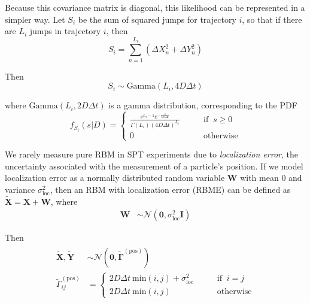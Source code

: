 \documentclass{article}
\renewcommand{\vec}{\mathbf}
\begin{document}
Because this covariance matrix is diagonal, this likelihood can be represented in a 
simpler way. Let $S_{i}$ be the sum of squared jumps for trajectory $i$, 
so that if there are $L_{i}$ jumps in trajectory $i$, then
\[
	S_{i} = \sum\limits_{n=1}^{L_{i}} \left( \Delta X_{n}^{2} + \Delta Y_{n}^{2} \right)
\]

Then 
\[
	S_{i} \sim \text{Gamma} \left( L_{i}, 4 D \Delta t \right)
\]

where $\text{Gamma} \left( L_{i}, 2 D \Delta t \right)$ is a gamma distribution,
corresponding to the PDF
\begin{equation}\label{eq:rbm_gamma_likelihood}
	f_{S_{i}}(s | D) = \begin{cases}
		\frac{
			s^{L_{i} - 1} e^{-\frac{s}{4 D \Delta t}}
		}{
			\Gamma \left( L_{i} \right) (4 D \Delta t)^{L_{i}}
		} \qquad &\text{if } \: s \geq 0 \\
		0 \qquad &\text{otherwise}
	\end{cases}
\end{equation}

We rarely measure pure RBM in SPT experiments due to \emph{localization error},
the uncertainty associated with the measurement of a particle's position. If we model
localization error as a normally distributed random variable $\vec{W}$ with mean 0 and variance 
$\sigma_{\text{loc}}^{2}$, then an RBM with localization error (RBME) can be defined as 
$\tilde{\vec{X}} = \vec{X} + \vec{W}$, where 
\begin{align*}
	\vec{W} &\sim \mathcal{N} \left( \vec{0}, \sigma_{\text{loc}}^{2} \vec{I} \right)
\end{align*}

Then
\begin{align}\begin{split}\label{eq:rbme_likelihood}
	\tilde{\vec{X}}, \tilde{\vec{Y}} &\sim \mathcal{N} \left( \vec{0}, \tilde{\boldsymbol{\Gamma}}^{(\text{pos})} \right) \\
	\tilde{\Gamma}^{(\text{pos})}_{ij} &= \begin{cases}
		2 D \Delta t \: \text{min} (i, j) + \sigma_{\text{loc}}^{2} \qquad &\text{if } \: i = j \\
		2 D \Delta t \: \text{min} (i, j) \qquad &\text{otherwise}
	\end{cases}
\end{split}\end{align}
\end{document}
